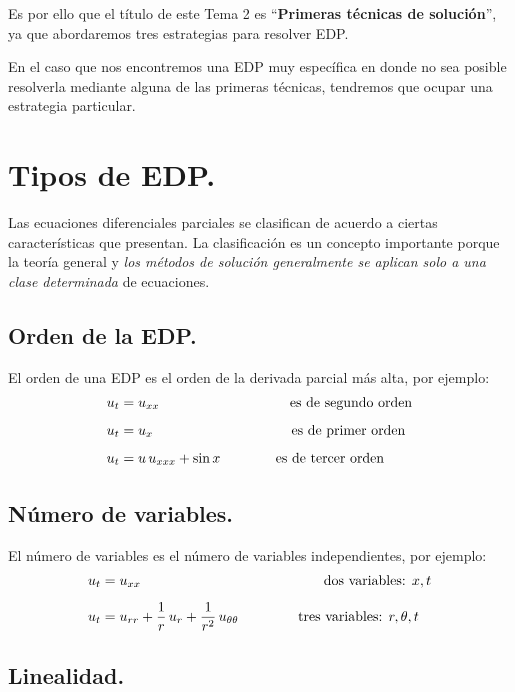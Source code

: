 \documentclass[12pt]{article}
\numberwithin{equation}{section}
\begin{document}
Es por ello que el título de este Tema 2 es \enquote{\textbf{Primeras técnicas de solución}}, ya que abordaremos tres estrategias para resolver EDP.
\par
En el caso que nos encontremos una EDP muy específica en donde no sea posible resolverla mediante alguna de las primeras técnicas, tendremos que ocupar una estrategia particular.

\section{Tipos de EDP.}

Las ecuaciones diferenciales parciales se clasifican de acuerdo a ciertas características que presentan. La clasificación es un concepto importante porque la teoría general y \emph{los métodos de solución generalmente se aplican solo a una clase determinada} de ecuaciones.

\subsection{Orden de la EDP.}
El orden de una EDP es el orden de la derivada parcial más alta, por ejemplo:
\begin{align*}
u_{t} &= u_{xx} \hspace{3.3cm} \mbox{es de segundo orden} \\[0.5em]
u_{t} &= u_{x} \hspace{3.5cm} \mbox{es de primer orden} \\[0.5em]
u_{t} &= u \, u_{xxx} + \sin x \hspace{1.4cm} \mbox{es de tercer orden}
\end{align*}

\subsection{Número de variables.}
El número de variables es el número de variables independientes, por ejemplo:
\begin{align*}
u_{t} &= u_{xx} \hspace{3cm} \hspace{1.61cm} \mbox{dos variables: } x, t \\[0.5em] 
u_{t} &= u_{rr} + \dfrac{1}{r} \, u_{r} + \dfrac{1}{r^{2}} \, u_{\theta \theta} \hspace{1.5cm} \mbox{tres variables: } r, \theta, t
\end{align*}

\subsection{Linealidad.}
\end{document}
